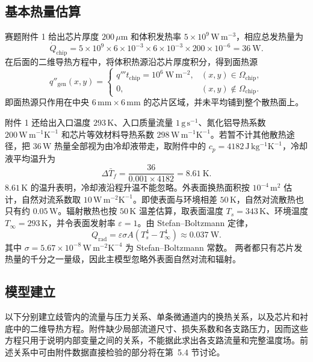 \documentclass[withoutpreface,bwprint]{cumcmthesis}
\begin{document}
\subsection{基本热量估算}
赛题附件 1 给出芯片厚度 $200\,\mu\mathrm{m}$ 和体积发热率 $5\times10^9\,\mathrm{W\,m^{-3}}$，相应总发热量为
\begin{equation}
\dot Q_{\mathrm{chip}}=5\times10^9\times6\times10^{-3}\times6\times10^{-3}
\times200\times10^{-6}=36\ \mathrm W.
\end{equation}
在后面的二维导热方程中，将体积热源沿芯片厚度积分，得到面热源
\begin{equation}
q''_{\mathrm{gen}}(x,y)=
\begin{cases}
q'''t_{\mathrm{chip}}=10^6\ \mathrm{W\,m^{-2}}, & (x,y)\in\Omega_{\mathrm{chip}},\\
0, & (x,y)\notin\Omega_{\mathrm{chip}}.
\end{cases}
\label{eq:source}
\end{equation}
即面热源只作用在中央 $6\,\mathrm{mm}\times6\,\mathrm{mm}$ 的芯片区域，并未平均铺到整个散热面上。

附件 1 还给出入口温度 $293\,\mathrm K$、入口质量流量 $1\,\mathrm{g\,s^{-1}}$、氮化铝导热系数 $200\,\mathrm{W\,m^{-1}K^{-1}}$ 和芯片等效材料导热系数 $298\,\mathrm{W\,m^{-1}K^{-1}}$。若暂不计其他散热途径，把 $36\,\mathrm W$ 热量全部视为由冷却液带走，取附件中的 $c_p=4182\,\mathrm{J\,kg^{-1}K^{-1}}$，冷却液平均温升为
\begin{equation}
\Delta\bar T_f=\frac{36}{0.001\times4182}=8.61\ \mathrm K.
\label{eq:coolant-rise}
\end{equation}
$8.61\,\mathrm K$ 的温升表明，冷却液沿程升温不能忽略。外表面换热面积按 $10^{-4}\,\mathrm{m^2}$ 估计，自然对流系数取 $10\,\mathrm{W\,m^{-2}K^{-1}}$。即使表面与环境相差 $50\,\mathrm K$，自然对流散热也只有约 $0.05\,\mathrm W$。辐射散热也按 $50\,\mathrm K$ 温差估算，取表面温度 $T_s=343\,\mathrm K$、环境温度 $T_\infty=293\,\mathrm K$，并令表面发射率 $\varepsilon=1$。由 Stefan--Boltzmann 定律，
\begin{equation}
\dot Q_{\mathrm{rad}}=\varepsilon\sigma A(T_s^4-T_\infty^4)\approx0.037\ \mathrm W.
\end{equation}
其中 $\sigma=5.67\times10^{-8}\,\mathrm{W\,m^{-2}K^{-4}}$ 为 Stefan--Boltzmann 常数。
两者都只有芯片发热量的千分之一量级，因此主模型忽略外表面自然对流和辐射。

\subsection{模型建立}
以下分别建立歧管内的流量与压力关系、单条微通道内的换热关系，以及芯片和衬底中的二维导热方程。附件缺少局部流道尺寸、损失系数和各支路压力，因而这些方程只用于说明内部变量之间的关系，不能据此求出各支路流量和完整温度场。前述关系中可由附件数据直接检验的部分将在第~5.4 节讨论。
\end{document}
